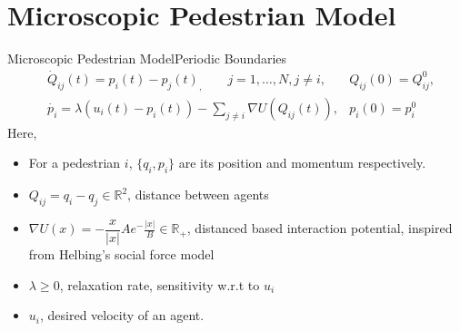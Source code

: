 \section{Microscopic Pedestrian Model}

\begin{frame}{Microscopic Pedestrian Model}{Periodic Boundaries}
    \begin{align*}
        &\dot{Q}_{ij}(t) = p_i(t) - p_j(t)_, \quad \quad j=1,\dots,N, j\neq i, &Q_{ij}(0) = Q^0_{ij}, \\
        &\dot{p_i} = \lambda(u_i(t) - p_i(t)) - \sum_{j\neq i} \nabla U(Q_{ij}(t)), &p_i(0) = p^0_i
    \end{align*}
    Here,\linebreak
    \begin{itemize}
        \item For a pedestrian $i$, $\{q_i, p_i\}$ are its position and momentum respectively.
        \item $Q_{ij} = q_i - q_j \in \mathbb{R}^2$, distance between agents
        \item $\nabla U(x) = -\dfrac{x}{|x|}Ae^-\frac{|x|}{B} \in \mathbb{R_+}$, distanced based interaction potential, inspired from Helbing's social force model \cite{Helbing1995}
        \item $\lambda \geq 0$, relaxation rate, sensitivity w.r.t to $u_i$
        \item $u_i$, desired velocity of an agent.
    \end{itemize}
\end{frame}
